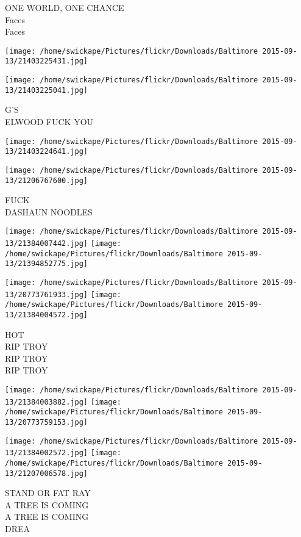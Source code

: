 \documentclass[10pt,letterpaper]{article}
\begin{document}
ONE WORLD, ONE CHANCE\\
Faces\\
Faces
\pagebreak

\texttt{[image: /home/swickape/Pictures/flickr/Downloads/Baltimore 2015-09-13/21403225431.jpg]}

\vspace{0.25in}
\texttt{[image: /home/swickape/Pictures/flickr/Downloads/Baltimore 2015-09-13/21403225041.jpg]}

G'S\\
ELWOOD FUCK YOU
\pagebreak

\texttt{[image: /home/swickape/Pictures/flickr/Downloads/Baltimore 2015-09-13/21403224641.jpg]}

\vspace{0.25in}
\texttt{[image: /home/swickape/Pictures/flickr/Downloads/Baltimore 2015-09-13/21206767600.jpg]}

FUCK\\
DASHAUN NOODLES
\pagebreak

\texttt{[image: /home/swickape/Pictures/flickr/Downloads/Baltimore 2015-09-13/21384007442.jpg]}
\texttt{[image: /home/swickape/Pictures/flickr/Downloads/Baltimore 2015-09-13/21394852775.jpg]}

\texttt{[image: /home/swickape/Pictures/flickr/Downloads/Baltimore 2015-09-13/20773761933.jpg]}
\texttt{[image: /home/swickape/Pictures/flickr/Downloads/Baltimore 2015-09-13/21384004572.jpg]}

HOT\\
RIP TROY\\
RIP TROY\\
RIP TROY
\pagebreak

\texttt{[image: /home/swickape/Pictures/flickr/Downloads/Baltimore 2015-09-13/21384003882.jpg]}
\texttt{[image: /home/swickape/Pictures/flickr/Downloads/Baltimore 2015-09-13/20773759153.jpg]}

\texttt{[image: /home/swickape/Pictures/flickr/Downloads/Baltimore 2015-09-13/21384002572.jpg]}
\texttt{[image: /home/swickape/Pictures/flickr/Downloads/Baltimore 2015-09-13/21207006578.jpg]}

STAND OR FAT RAY\\
A TREE IS COMING\\
A TREE IS COMING\\
DREA
\pagebreak
\end{document}

